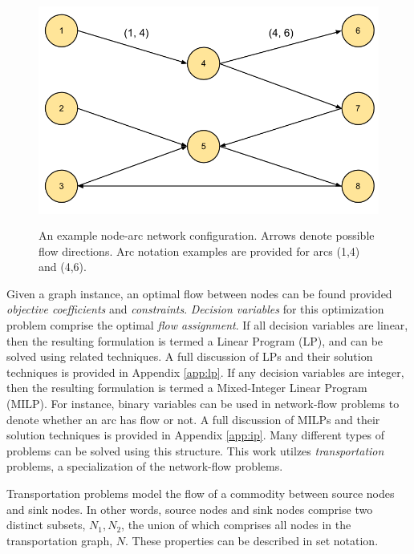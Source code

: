 \begin{figure}[H]
  \begin{center}
    \includegraphics[height=7.5cm]{./chapters/1-intro/figs/node-arcs.png}
  \caption{An example node-arc network configuration. Arrows denote possible
    flow directions. Arc notation examples are provided for arcs (1,4) and
    (4,6).}
  \label{fig:node-arcs}
  \end{center}
\end{figure}

Given a graph instance, an optimal flow between nodes can be found provided
\textit{objective coefficients} and \textit{constraints}. \textit{Decision
  variables} for this optimization problem comprise the optimal \textit{flow
  assignment}. If all decision variables are linear, then the resulting
formulation is termed a Linear Program (LP), and can be solved using related
techniques. A full discussion of LPs and their solution techniques is provided
in Appendix \ref{app:lp}. If any decision variables are integer, then the
resulting formulation is termed a Mixed-Integer Linear Program (MILP). For
instance, binary variables can be used in network-flow problems to denote
whether an arc has flow or not. A full discussion of MILPs and their solution
techniques is provided in Appendix \ref{app:ip}. Many different types of
problems can be solved using this structure. This work utilzes
\textit{transportation} problems, a specialization of the network-flow problems.

Transportation problems model the flow of a commodity between source nodes and
sink nodes. In other words, source nodes and sink nodes comprise two distinct
subsets, $N_1, N_2$, the union of which comprises all nodes in the
transportation graph, $N$. These properties can be described in set notation.

